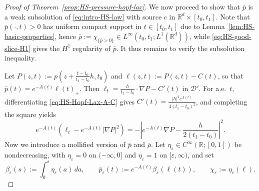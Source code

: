 \documentclass[11pt]{amsart}
\numberwithin{equation}{section}
\numberwithin{figure}{section}
\theoremstyle{plain}
\theoremstyle{definition}
\theoremstyle{remark}
\theoremstyle{plain}
\newcommand{\abs}[1]{\lvert #1 \rvert}
\newcommand{\vep}{\varepsilon}
\def\R{\mathbb{R}}
\begin{document}
\begin{proof}[Proof of Theorem~\ref{prop:HS-pressure-hopf-lax}]
We now proceed to show that $\bar{p}$ is a weak subsolution of \eqref{eq:intro-HS-law} with source $c$ in $\R^d\times [t_0,t_1]$.
Note that $\bar{p}(\cdot,t)>0$ has uniform compact support in \(t\in[t_0,t_1]\) due to Lemma~\ref{lem:HS-basic-properties}, hence
\(\bar\rho:=\chi_{\{\bar p>0\}} \in L^\infty(t_0,t_1;L^1(\R^d))\), while
\eqref{eq:HS-good-slice-H1} gives the \(H^1\) regularity of \(\bar p\).  It thus remains to verify the subsolution inequality. 



Let \(P(z,t):=p\left(z+\frac{t-t_0}{t_1-t_0}h,t_0\right)\) and
\(\ell(z,t):=P(z,t)-C(t)\), so that $\bar{p}(t)=e^{-A(t)}\ell(t)_+$. Then
\(\ell_t=\frac{h}{t_1-t_0}\cdot\nabla P-C'(t)\) in $\mathcal{D}'$.
For a.e.\ \(t\), differentiating \eqref{eq:HS-Hopf-Lax-A-C} gives
\(C'(t)=\frac{\abs{h}^2e^{A(t)}}{4(t_1-t_0)^2}\), and completing the square yields
\begin{equation}\label{eq:HS-Hopf-Lax-square}
    e^{-A(t)}
    \left(\ell_t-e^{-A(t)}\abs{\nabla P}^2\right)
    =
    -\left|e^{-A(t)}\nabla P-\frac{h}{2(t_1-t_0)}\right|^2 .
\end{equation}
Now we introduce a mollified version of $\bar{p}$ and $\bar{\rho}$.
Let
\(\eta_\vep\in C^\infty(\R;[0,1])\) be nondecreasing, with
\(\eta_\vep=0\) on \((-\infty,0]\) and \(\eta_\vep=1\) on
\([\vep,\infty)\), and set
\[
    \beta_\vep(s):=\int_0^s\eta_\vep(a)\,da,\qquad
    \bar p_\vep(t):=e^{-A(t)}\beta_\vep(\ell(t)),\qquad
    \chi_\vep:=\eta_\vep(\ell).
\]


\end{proof}
\end{document}
